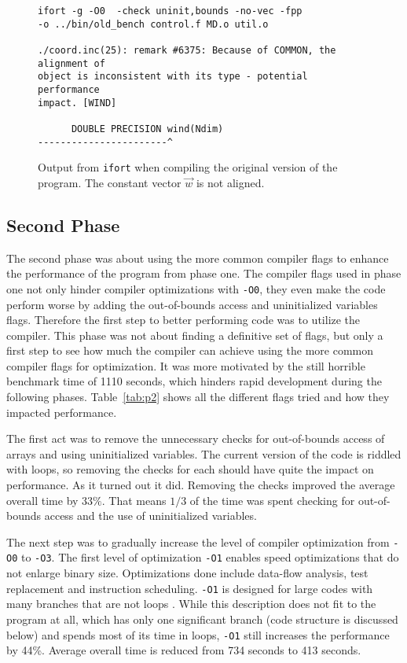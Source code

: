 \documentclass[twoside,11pt]{article}
\begin{document}
\begin{figure}
\begin{verbatim}
ifort -g -O0  -check uninit,bounds -no-vec -fpp
-o ../bin/old_bench control.f MD.o util.o

./coord.inc(25): remark #6375: Because of COMMON, the alignment of
object is inconsistent with its type - potential performance
impact. [WIND]

      DOUBLE PRECISION wind(Ndim)
-----------------------^
\end{verbatim}
\caption{Output from \texttt{ifort} when compiling the original
  version of the program. The constant vector $\vec{w}$ is not
  aligned.}
\label{fig:common_unaligned}
\end{figure}


\subsection{Second Phase} %
\label{subsec:p2}

The second phase was about using the more common compiler flags to
enhance the performance of the program from phase one.
The compiler flags used in phase one not only hinder compiler
optimizations with \texttt{-O0}, they even make the code perform worse
by adding the out-of-bounds access and uninitialized variables flags.
Therefore the first step to better performing code was to utilize the
compiler.
This phase was not about finding a definitive set of flags, but only
a first step to see how much the compiler can achieve using the
more common compiler flags for optimization.
It was more motivated by the still horrible benchmark time of 1110
seconds, which hinders rapid development during the following phases.
Table~\ref{tab:p2} shows all the different flags tried and how they
impacted performance.

The first act was to remove the unnecessary checks for out-of-bounds
access of arrays and using uninitialized variables.
The current version of the code is riddled with loops, so removing
the checks for each should have quite the impact on performance.
As it turned out it did.
Removing the checks improved the average overall time by $33\%$.
That means $1/3$ of the time was spent checking for out-of-bounds
access and the use of uninitialized variables.

The next step was to gradually increase the level of compiler
optimization from \texttt{-O0} to \texttt{-O3}.
The first level of optimization \texttt{-O1} enables speed
optimizations that do not enlarge binary size.
Optimizations done include data-flow analysis, test replacement and
instruction scheduling.
\texttt{-O1} is designed for large codes with many branches that
are not loops \citep{o}.
While this description does not fit to the program at all, which
has only one significant branch (code structure is discussed below)
and spends most of its time in loops, \texttt{-O1} still increases
the performance by 44\%.
Average overall time is reduced from 734 seconds to 413 seconds.
\end{document}
